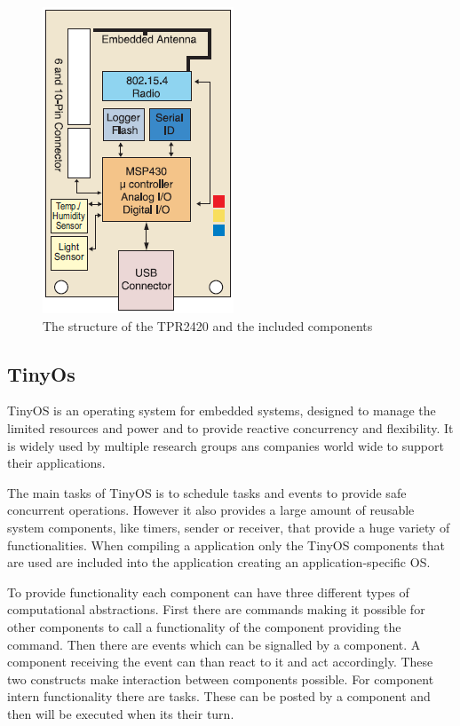 \begin{figure}[htbp]
	\centering
    \includegraphics[scale=0.7]{content/images/Mote1}
   	\caption{The structure of the TPR2420 and the included components \cite{telosb}}
    \label{fig:telosb}
\end{figure}
 
\subsection{TinyOs}
TinyOS is an operating system for embedded systems, designed to manage the limited resources and power and to provide reactive concurrency and flexibility. It is widely used by multiple research groups ans companies world wide to support their applications.

The main tasks of TinyOS is to schedule tasks and events to provide safe concurrent operations. However it also provides a large amount of reusable system components, like timers, sender or receiver, that provide a huge variety of functionalities. When compiling a application only the TinyOS components that are used are included into the application creating an application-specific OS.

To provide functionality each component can have three different types of computational abstractions. First there are commands making it possible for other components to call a functionality of the component providing the command. Then there are events which can be signalled by a component. A component receiving the event can than react to it and act accordingly. These two constructs make interaction between components possible. For component intern functionality there are tasks. These can be posted by a component and then will be executed when its their turn. 

